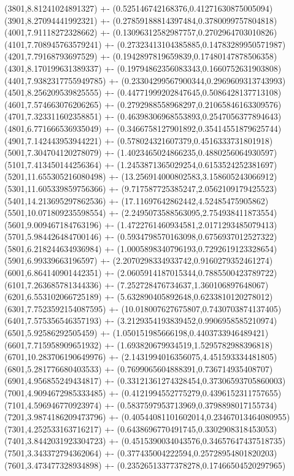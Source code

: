 {(3801,8.81241024891327) +- (0.525146742168376,0.41271630875005094)
(3901,8.27094441992321) +- (0.27859188814397484,0.3780099757804818)
(4001,7.91118272328662) +- (0.13096312582987757,0.2702964703010826)
(4101,7.708945763579241) +- (0.27323413104385885,0.14783289950571987)
(4201,7.79168793697529) +- (0.1942897819659839,0.17480147878506358)
(4301,8.170199631389337) +- (0.19794862356083343,0.1660752631903808)
(4401,7.9382317755949785) +- (0.23304299567900344,0.2969609313743993)
(4501,8.256209539825555) +- (0.44771999202847645,0.5086428137713108)
(4601,7.574663076206265) +- (0.2792988558968297,0.21065846163309576)
(4701,7.323311602358851) +- (0.46398306968553893,0.2547056377894643)
(4801,6.771666536935049) +- (0.3466758127901892,0.35414551879625744)
(4901,7.142443953944221) +- (0.578024321607379,0.4516333731801918)
(5001,7.304704120278079) +- (1.4023465024866235,0.4880256064930597)
(5101,7.413450144256364) +- (1.2453871365029254,0.6153524252381697)
(5201,11.655305216080498) +- (13.256914000802583,3.158605243066912)
(5301,11.605339859756366) +- (9.717587725385247,2.0562109179425523)
(5401,14.213695297862536) +- (17.11697642862442,4.52485475905862)
(5501,10.071809235598554) +- (2.2495073588563095,2.754938411873554)
(5601,9.009467184763196) +- (1.4722761460934581,2.0171293485079413)
(5701,5.984426484700146) +- (0.5934798570163098,0.6756937012527322)
(5801,6.218244634936984) +- (1.0005898340796193,0.7292619123328654)
(5901,6.99339663196597) +- (2.2070298334933742,0.9160279352461274)
(6001,6.864140901442351) +- (2.0605914187015344,0.7885500423789722)
(6101,7.263685781344336) +- (7.252728476734637,1.360106897648067)
(6201,6.553102066725189) +- (5.632890405892648,0.6233810120278012)
(6301,7.7523592154087595) +- (10.018007627675807,0.7430703874137405)
(6401,7.575356546357193) +- (3.2129354193839452,0.9906958585210974)
(6501,5.92586292505459) +- (1.050151985666198,0.4403733946489421)
(6601,7.715958909651932) +- (1.693820679934519,1.5295782988396818)
(6701,10.283706190649976) +- (2.1431994016356075,4.451593334481805)
(6801,5.281776680403533) +- (0.7699065604888391,0.736714935408707)
(6901,4.956855249434817) +- (0.33121361274328454,0.37306593705860003)
(7001,4.9094672985333485) +- (0.4121994552775279,0.4396152311757655)
(7101,4.596946770923974) +- (0.5837597953713969,0.3798898017155734)
(7201,3.9874186209473796) +- (0.40544081101602014,0.23467013464080955)
(7301,4.252533163716217) +- (0.6438696770491745,0.3302908318453053)
(7401,3.8442031923304723) +- (0.4515390034043576,0.34657647437518735)
(7501,3.343372794362064) +- (0.377435004222594,0.25728954801820203)
(7601,3.473477328934898) +- (0.23526513377378278,0.17466504520297965)
}
